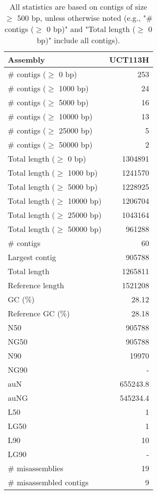 \documentclass[12pt,a4paper]{article}
\begin{document}
\begin{table}[ht]
\begin{center}
\caption{All statistics are based on contigs of size $\geq$ 500 bp, unless otherwise noted (e.g., "\# contigs ($\geq$ 0 bp)" and "Total length ($\geq$ 0 bp)" include all contigs).}
\begin{tabular}{|l*{1}{|r}|}
\hline
Assembly & UCT113H \\ \hline
\# contigs ($\geq$ 0 bp) & 253 \\ \hline
\# contigs ($\geq$ 1000 bp) & 24 \\ \hline
\# contigs ($\geq$ 5000 bp) & 16 \\ \hline
\# contigs ($\geq$ 10000 bp) & 13 \\ \hline
\# contigs ($\geq$ 25000 bp) & 5 \\ \hline
\# contigs ($\geq$ 50000 bp) & 2 \\ \hline
Total length ($\geq$ 0 bp) & 1304891 \\ \hline
Total length ($\geq$ 1000 bp) & 1241570 \\ \hline
Total length ($\geq$ 5000 bp) & 1228925 \\ \hline
Total length ($\geq$ 10000 bp) & 1206704 \\ \hline
Total length ($\geq$ 25000 bp) & 1043164 \\ \hline
Total length ($\geq$ 50000 bp) & 961288 \\ \hline
\# contigs & 60 \\ \hline
Largest contig & 905788 \\ \hline
Total length & 1265811 \\ \hline
Reference length & 1521208 \\ \hline
GC (\%) & 28.12 \\ \hline
Reference GC (\%) & 28.18 \\ \hline
N50 & 905788 \\ \hline
NG50 & 905788 \\ \hline
N90 & 19970 \\ \hline
NG90 & - \\ \hline
auN & 655243.8 \\ \hline
auNG & 545234.4 \\ \hline
L50 & 1 \\ \hline
LG50 & 1 \\ \hline
L90 & 10 \\ \hline
LG90 & - \\ \hline
\# misassemblies & 19 \\ \hline
\# misassembled contigs & 9 \\ \hline

\end{tabular}
\end{center}
\end{table}
\end{document}
